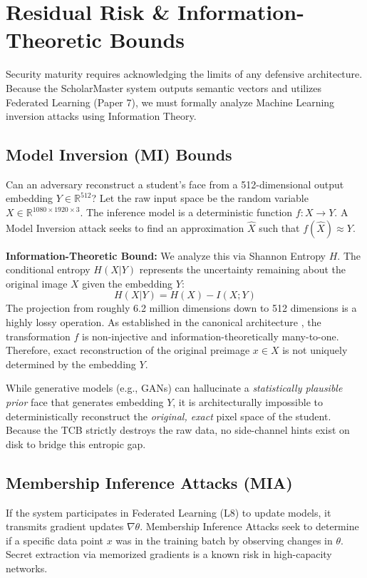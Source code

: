 \documentclass[conference]{IEEEtran}
\begin{document}
\section{Residual Risk \& Information-Theoretic Bounds}
Security maturity requires acknowledging the limits of any defensive architecture. Because the ScholarMaster system outputs semantic vectors and utilizes Federated Learning (Paper 7), we must formally analyze Machine Learning inversion attacks using Information Theory.

\subsection{Model Inversion (MI) Bounds}
Can an adversary reconstruct a student's face from a 512-dimensional output embedding $Y \in \mathbb{R}^{512}$?
Let the raw input space be the random variable $X \in \mathbb{R}^{1080 \times 1920 \times 3}$.
The inference model is a deterministic function $f: X \to Y$. 
A Model Inversion attack \cite{b23} seeks to find an approximation $\hat{X}$ such that $f(\hat{X}) \approx Y$.

\textbf{Information-Theoretic Bound:} We analyze this via Shannon Entropy $H$. The conditional entropy $H(X | Y)$ represents the uncertainty remaining about the original image $X$ given the embedding $Y$:
\begin{equation}
H(X | Y) = H(X) - I(X;Y)
\end{equation}
The projection from roughly 6.2 million dimensions down to 512 dimensions is a highly lossy operation. As established in the canonical architecture \cite{P17}, the transformation $f$ is non-injective and information-theoretically many-to-one. Therefore, exact reconstruction of the original preimage $x \in X$ is not uniquely determined by the embedding $Y$.

While generative models (e.g., GANs) can hallucinate a \textit{statistically plausible prior} face that generates embedding $Y$, it is architecturally impossible to deterministically reconstruct the \textit{original, exact} pixel space of the student. Because the TCB strictly destroys the raw data, no side-channel hints exist on disk to bridge this entropic gap. 

\subsection{Membership Inference Attacks (MIA)}
If the system participates in Federated Learning (L8) to update models, it transmits gradient updates $\nabla \theta$. Membership Inference Attacks \cite{b5} seek to determine if a specific data point $x$ was in the training batch by observing changes in $\theta$. Secret extraction via memorized gradients \cite{b21} is a known risk in high-capacity networks.
\end{document}
